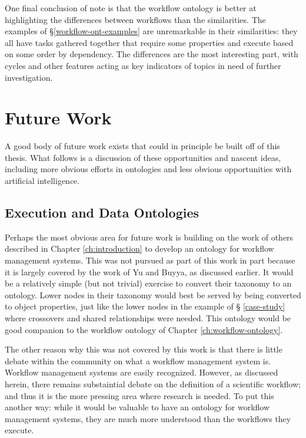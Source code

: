 One final conclusion of note is that the workflow ontology is better at
highlighting the differences between workflows than the similarities. The
examples of \S \ref{workflow-ont-examples} are unremarkable in their
similarities: they all have tasks gathered together that require some properties
and execute based on some order by dependency. The differences are the most
interesting part, with cycles and other features acting as key indicators of
topics in need of further investigation.

\section{Future Work}

A good body of future work exists that could in principle be built off of this
thesis. What follows is a discussion of these opportunities and nascent ideas,
including more obvious efforts in ontologies and less obvious opportunities with
artificial intelligence.

\subsection{Execution and Data Ontologies}

Perhaps the most obvious area for future work is building on the work of others
described in Chapter \ref{ch:introduction} to develop an ontology for workflow
management systems. This was not pursued as part of this work in part because it
is largely covered by the work of Yu and Buyya, as discussed earlier. It would
be a relatively simple (but not trivial) exercise to convert their taxonomy to
an ontology. Lower nodes in their taxonomy would best be served by being
converted to object properties, just like the lower nodes in the example of \S
\ref{case-study} where crossovers and shared relationships were needed. This
ontology would be good companion to the workflow ontology of Chapter
\ref{ch:workflow-ontology}.

The other reason why this was not covered by this work is that there is little
debate within the community on what a workflow management system is. Workflow
management systems are easily recognized. However, as discussed herein, there
remains substaintial debate on the definition of a scientific workflow; and thus
it is the more pressing area where research is needed. To put this another way:
while it would be valuable to have an ontology for workflow management systems,
they are much more understood than the workflows they execute.

